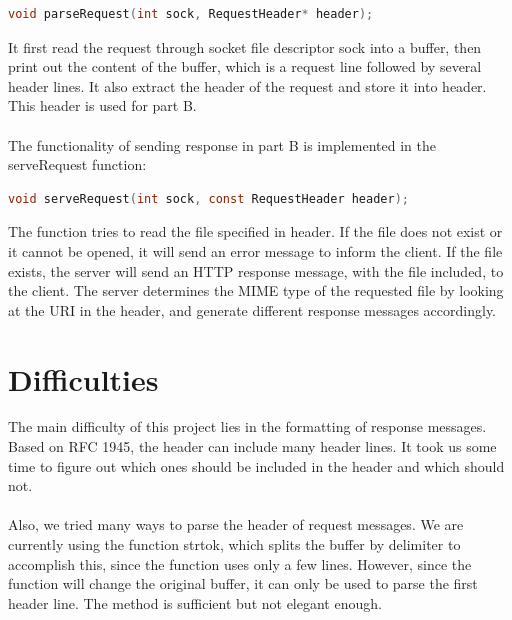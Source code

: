 \documentclass[a4paper, 11pt]{report}
\begin{document}
\begin{lstlisting}[language=C]
void parseRequest(int sock, RequestHeader* header);
\end{lstlisting}

\noindent It first read the request through socket file descriptor {\selectfont sock} into a buffer, then print out the content of the buffer, which is a request line followed by several header lines. It also extract the header of the request and store it into {\selectfont header}. This header is used for part B.\\\\

\noindent The functionality of sending response in part B is implemented in the {\selectfont serveRequest} function:

\begin{lstlisting}[language=C]
void serveRequest(int sock, const RequestHeader header);
\end{lstlisting}

\noindent The function tries to read the file specified in {\selectfont header}. If the file does not exist or it cannot be opened, it will send an error message to inform the client. If the file exists, the server will send an HTTP response message, with the file included, to the client. The server determines the MIME type of the requested file by looking at the URI in the header, and generate different response messages accordingly.


\section*{Difficulties}

The main difficulty of this project lies in the formatting of response messages. Based on RFC 1945, the header can include many header lines. It took us some time to figure out which ones should be included in the header and which should not.\\\\

\noindent Also, we tried many ways to parse the header of request messages. We are currently using the function {\selectfont strtok}, which splits the buffer by delimiter to accomplish this, since the function uses only a few lines. However, since the function will change the original buffer, it can only be used to parse the first header line. The method is sufficient but not elegant enough.\\\\
\end{document}
